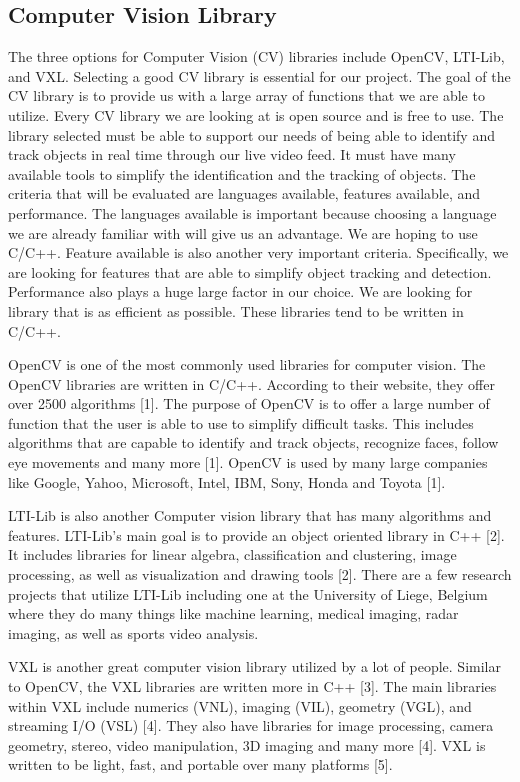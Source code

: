 \documentclass[letterpaper,10pt,onecolumn,draftclsnofoot]{IEEEtran}
\begin{document}
\subsection{Computer Vision Library} %
The three options for Computer Vision (CV) libraries include OpenCV, LTI-Lib, and VXL.
Selecting a good CV library is essential for our project.
The goal of the CV library is to provide us with a large array of functions that we are able to utilize.
Every CV library we are looking at is open source and is free to use.
The library selected must be able to support our needs of being able to identify and track objects in real time through our live video feed.
It must have many available tools to simplify the identification and the tracking of objects.
The criteria that will be evaluated are languages available, features available, and performance.
The languages available is important because choosing a language we are already familiar with will give us an advantage.
We are hoping to use C/C++.
Feature available is also another very important criteria.
Specifically, we are looking for features that are able to simplify object tracking and detection.
Performance also plays a huge large factor in our choice.
We are looking for library that is as efficient as possible.
These libraries tend to be written in C/C++.

OpenCV is one of the most commonly used libraries for computer vision.
The OpenCV libraries are written in C/C++.
According to their website, they offer over 2500 algorithms [1].
The purpose of OpenCV is to offer a large number of function that the user is able to use to simplify difficult tasks.
This includes algorithms that are capable to identify and track objects, recognize faces, follow eye movements and many more [1].
OpenCV is used by many large companies like Google, Yahoo, Microsoft, Intel, IBM, Sony, Honda and Toyota [1]. 

LTI-Lib is also another Computer vision library that has many algorithms and features.
LTI-Lib's main goal is to provide an object oriented library in C++ [2].
It includes libraries for linear algebra, classification and clustering, image processing, as well as visualization and drawing tools [2].
There are a few research projects that utilize LTI-Lib including one at the University of Liege, Belgium where they do many things like machine learning, medical imaging, radar imaging, as well as sports video analysis.


VXL is another great computer vision library utilized by a lot of people.
Similar to OpenCV, the VXL libraries are written more in C++ [3].
The main libraries within VXL include numerics (VNL), imaging (VIL), geometry (VGL), and streaming I/O (VSL) [4].
They also have libraries for image processing, camera geometry, stereo, video manipulation, 3D imaging and many more [4].
VXL is written to be light, fast, and portable over many platforms [5].
\end{document}
